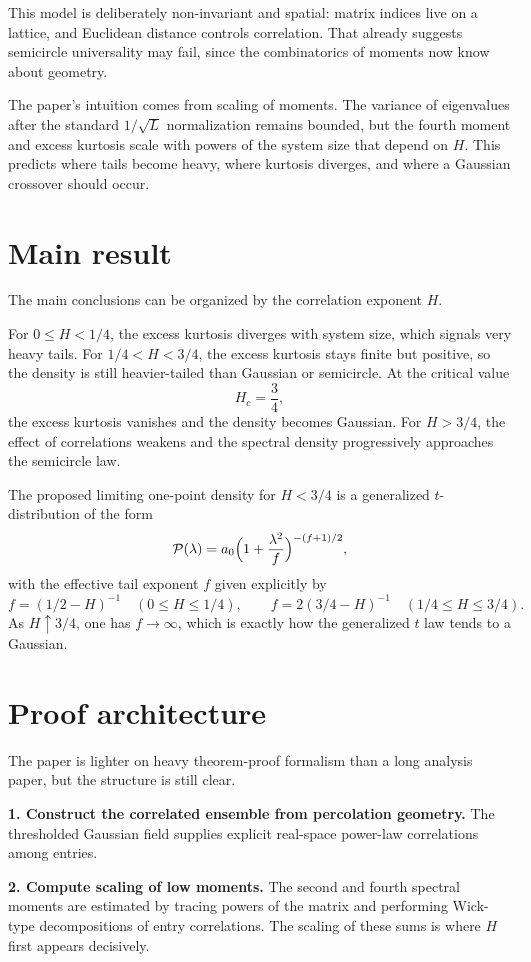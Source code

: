 \documentclass[11pt]{article}
\begin{document}
This model is deliberately non-invariant and spatial: matrix indices live on a lattice, and Euclidean distance controls correlation. That already suggests semicircle universality may fail, since the combinatorics of moments now know about geometry.

The paper's intuition comes from scaling of moments. The variance of eigenvalues after the standard $1/\sqrt L$ normalization remains bounded, but the fourth moment and excess kurtosis scale with powers of the system size that depend on $H$. This predicts where tails become heavy, where kurtosis diverges, and where a Gaussian crossover should occur.

\section*{Main result}
The main conclusions can be organized by the correlation exponent $H$.

For $0\le H<1/4$, the excess kurtosis diverges with system size, which signals very heavy tails. For $1/4<H<3/4$, the excess kurtosis stays finite but positive, so the density is still heavier-tailed than Gaussian or semicircle. At the critical value
\[
H_c=\frac34,
\]
the excess kurtosis vanishes and the density becomes Gaussian. For $H>3/4$, the effect of correlations weakens and the spectral density progressively approaches the semicircle law.

The proposed limiting one-point density for $H<3/4$ is a generalized $t$-distribution of the form
\[
\mathcal P(\lambda)=a_0\Bigl(1+\frac{\lambda^2}{f}\Bigr)^{-(f+1)/2},
\]
with the effective tail exponent $f$ given explicitly by
\[
f=(1/2-H)^{-1} \quad (0\le H\le 1/4),
\qquad
f=2(3/4-H)^{-1} \quad (1/4\le H\le 3/4).
\]
As $H\uparrow 3/4$, one has $f\to\infty$, which is exactly how the generalized $t$ law tends to a Gaussian.

\section*{Proof architecture}
The paper is lighter on heavy theorem-proof formalism than a long analysis paper, but the structure is still clear.

\textbf{1. Construct the correlated ensemble from percolation geometry.} The thresholded Gaussian field supplies explicit real-space power-law correlations among entries.

\textbf{2. Compute scaling of low moments.} The second and fourth spectral moments are estimated by tracing powers of the matrix and performing Wick-type decompositions of entry correlations. The scaling of these sums is where $H$ first appears decisively.
\end{document}
